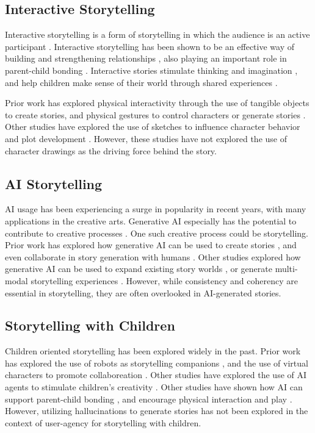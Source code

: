 \documentclass[submit,techrep,english]{ipsj}
\begin{document}
\subsection{Interactive Storytelling}
Interactive storytelling is a form of storytelling in which the audience is an active participant \cite{14:WangRCRMB22}. Interactive storytelling has been shown to be an effective way of building and strengthening relationships \cite{15:SchlauchSG22}, also playing an important role in parent-child bonding \cite{12:ZhangXWYRWYWL22}. Interactive stories stimulate thinking and imagination \cite{11:LimaGV20}, and help children make sense of their world through shared experiences \cite{9:RyokaiC99}.

Prior work has explored physical interactivity through the use of tangible objects \cite{9:RyokaiC99} to create stories, and physical gestures to control characters \cite{2:LiuLWCS12} or generate stories \cite{3:ZhaoB23}. Other studies have explored the use of sketches to influence character behavior and plot development \cite{11:LimaGV20}. However, these studies have not explored the use of character drawings as the driving force behind the story.

\subsection{AI Storytelling}
AI usage has been experiencing a surge in popularity in recent years, with many applications in the creative arts. Generative AI especially has the potential to contribute to creative processes \cite{6:TholanderJ23}. One such creative process could be storytelling. Prior work has explored how generative AI can be used to create stories \cite{13:abs-2011-04242}, and even collaborate in story generation with humans \cite{8:ShakeriND21}. Other studies explored how generative AI can be used to expand existing story worlds \cite{10:ChopraVSS21}, or generate multi-modal storytelling experiences \cite{4:HanC23}. However, while consistency and coherency are essential in storytelling, they are often overlooked in AI-generated stories.

\subsection{Storytelling with Children}
Children oriented storytelling has been explored widely in the past. Prior work has explored the use of robots as storytelling companions \cite{7:SunLLL17}, and the use of virtual characters to promote collaboreation \cite{2:LiuLWCS12}. Other studies have explored the use of AI agents to stimulate children's creativity \cite{1:ElgarfP22}. Other studies have shown how AI can support parent-child bonding \cite{12:ZhangXWYRWYWL22}, and encourage physical interaction and play \cite{3:ZhaoB23}.
However, utilizing hallucinations to generate stories has not been explored in the context of user-agency for storytelling with children.
\end{document}
